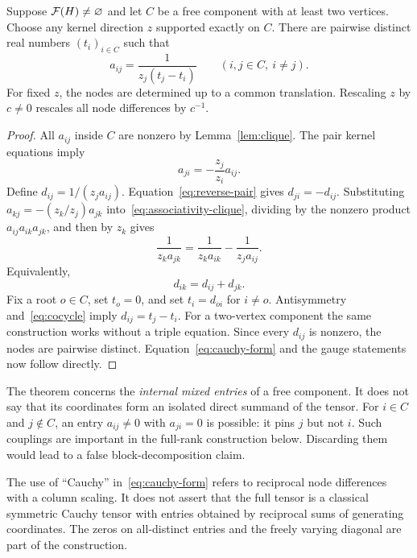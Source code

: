 \begin{theorem}\label{thm:cauchy-form}
Suppose $\mathcal F(H)\ne\varnothing$ and let $C$ be a free component with at least two vertices. Choose any kernel direction $z$ supported exactly on $C$. There are pairwise distinct real numbers $(t_i)_{i\in C}$ such that
\begin{equation}\label{eq:cauchy-form}
 a_{ij}=\frac{1}{z_j(t_j-t_i)}\qquad(i,j\in C,\ i\ne j).
\end{equation}
For fixed $z$, the nodes are determined up to a common translation. Rescaling $z$ by $c\ne0$ rescales all node differences by $c^{-1}$.
\end{theorem}
\begin{proof}
All $a_{ij}$ inside $C$ are nonzero by Lemma~\ref{lem:clique}. The pair kernel equations imply
\begin{equation}\label{eq:reverse-pair}
 a_{ji}=-\frac{z_j}{z_i}a_{ij}.
\end{equation}
Define $d_{ij}=1/(z_ja_{ij})$. Equation~\eqref{eq:reverse-pair} gives $d_{ji}=-d_{ij}$. Substituting $a_{kj}=-(z_k/z_j)a_{jk}$ into~\eqref{eq:associativity-clique}, dividing by the nonzero product $a_{ij}a_{ik}a_{jk}$, and then by $z_k$ gives
\[
 \frac{1}{z_ka_{jk}}=\frac{1}{z_ka_{ik}}-\frac{1}{z_ja_{ij}}.
\]
Equivalently,
\begin{equation}\label{eq:cocycle}
 d_{ik}=d_{ij}+d_{jk}.
\end{equation}
Fix a root $o\in C$, set $t_o=0$, and set $t_i=d_{oi}$ for $i\ne o$. Antisymmetry and~\eqref{eq:cocycle} imply $d_{ij}=t_j-t_i$. For a two-vertex component the same construction works without a triple equation. Since every $d_{ij}$ is nonzero, the nodes are pairwise distinct. Equation~\eqref{eq:cauchy-form} and the gauge statements now follow directly.
\end{proof}

The theorem concerns the \emph{internal mixed entries} of a free component. It does not say that its coordinates form an isolated direct summand of the tensor. For $i\in C$ and $j\notin C$, an entry $a_{ij}\ne0$ with $a_{ji}=0$ is possible: it pins $j$ but not $i$. Such couplings are important in the full-rank construction below. Discarding them would lead to a false block-decomposition claim.

The use of ``Cauchy'' in~\eqref{eq:cauchy-form} refers to reciprocal node differences with a column scaling. It does not assert that the full tensor is a classical symmetric Cauchy tensor with entries obtained by reciprocal sums of generating coordinates. The zeros on all-distinct entries and the freely varying diagonal are part of the construction.

